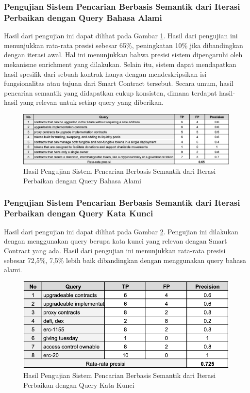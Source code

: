 \subsubsection{Pengujian Sistem Pencarian Berbasis Semantik dari Iterasi Perbaikan dengan Query Bahasa Alami}

Hasil dari pengujian ini dapat dilihat pada Gambar \ref{image:pengujian-2}. Hasil dari pengujian ini menunjukkan rata-rata presisi sebesar 65\%, peningkatan 10\% jika dibandingkan dengan iterasi awal. Hal ini menunjukkan bahwa presisi sistem dipengaruhi oleh mekanisme enrichment yang dilakukan. Selain itu, sistem dapat mendapatkan hasil spesifik dari sebuah kontrak hanya dengan mendeskripsikan isi fungsionalitas atau tujuan dari Smart Contract tersebut. Secara umum, hasil pencarian semantik yang didapatkan cukup konsisten, dimana terdapat hasil-hasil yang relevan untuk setiap query yang diberikan.

\begin{figure}[ht]
	\centering
	\includegraphics[width=1\textwidth]{resources/chapter-4/data-1-2.png}
	\caption{Hasil Pengujian Sistem Pencarian Berbasis Semantik dari Iterasi Perbaikan dengan Query Bahasa Alami}
	\label{image:pengujian-2}
\end{figure}

\subsubsection{Pengujian Sistem Pencarian Berbasis Semantik dari Iterasi Perbaikan dengan Query Kata Kunci}

Hasil dari pengujian ini dapat dilihat pada Gambar \ref{image:pengujian-3}. Pengujian ini dilakukan dengan menggunakan query berupa kata kunci yang relevan dengan Smart Contract yang ada. Hasil dari pengujian ini menunjukkan rata-rata presisi sebesar 72,5\%, 7,5\% lebih baik dibandingkan dengan menggunakan query bahasa alami.

\begin{figure}[ht]
	\centering
	\includegraphics[width=1\textwidth]{resources/chapter-4/data-1-3.png}
	\caption{Hasil Pengujian Sistem Pencarian Berbasis Semantik dari Iterasi Perbaikan dengan Query Kata Kunci}
	\label{image:pengujian-3}
\end{figure}

